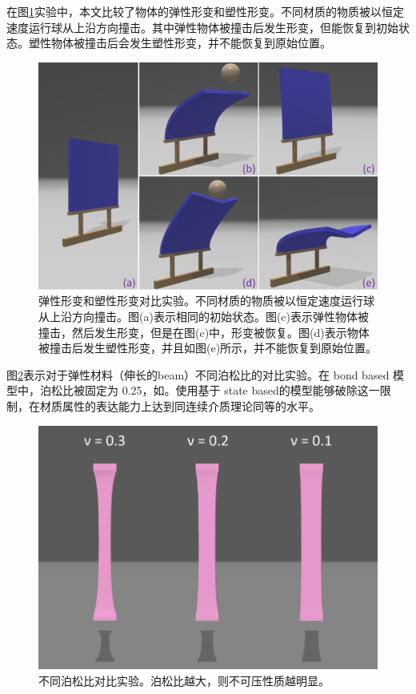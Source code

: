 在图\ref{demo_impact_upside}实验中，本文比较了物体的弹性形变和塑性形变。不同材质的物质被以恒定速度运行球从上沿方向撞击。其中弹性物体被撞击后发生形变，但能恢复到初始状态。塑性物体被撞击后会发生塑性形变，并不能恢复到原始位置。

\begin{figure}[!htb]
  \centering
  \captionsetup{justification=centering}
  \includegraphics[width=0.7\linewidth]{chap/image/demo_impact_upside}

  \caption{\label{demo_impact_upside}
           弹性形变和塑性形变对比实验。不同材质的物质被以恒定速度运行球从上沿方向撞击。图(a)表示相同的初始状态。图(c)表示弹性物体被撞击，然后发生形变，但是在图(c)中，形变被恢复。图(d)表示物体被撞击后发生塑性形变，并且如图(e)所示，并不能恢复到原始位置。
          }
\end{figure}

图\ref{compare_different_poisson_ratio}表示对于弹性材料（伸长的beam）不同泊松比的对比实验。在 bond based 模型中，泊松比被固定为 0.25，如。使用基于 state based的模型能够破除这一限制，在材质属性的表达能力上达到同连续介质理论同等的水平。

\begin{figure}[!htb]
  \centering
  \captionsetup{justification=centering}
  \includegraphics[width=0.7\linewidth]{chap/image/compare_different_poisson_ratio}

  \caption{\label{compare_different_poisson_ratio}
           不同泊松比对比实验。泊松比越大，则不可压性质越明显。
          }
\end{figure}

